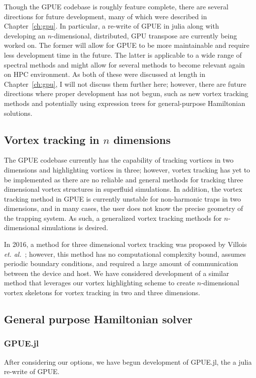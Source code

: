 Though the GPUE codebase is roughly feature complete, there are several directions for future development, many of which were described in Chapter~\ref{ch:gpu}.
In particular, a re-write of GPUE in julia along with developing an $n$-dimensional, distributed, GPU transpose are currently being worked on.
The former will allow for GPUE to be more maintainable and require less development time in the future.
The latter is applicable to a wide range of spectral methods and might allow for several methods to become relevant again on HPC environment.
As both of these were discussed at length in Chapter~\ref{ch:gpu}, I will not discuss them further here; however,
there are future directions where proper development has not begun, such as new vortex tracking methods and potentially using expression trees for general-purpose Hamiltonian solutions.

\subsection{Vortex tracking in $n$ dimensions}

The GPUE codebase currently has the capability of tracking vortices in two dimensions and highlighting vortices in three; however, vortex tracking has yet to be implemented as there are no reliable and general methods for tracking three dimensional vortex structures in superfluid simulations.
In addition, the vortex tracking method in GPUE is currently unstable for non-harmonic traps in two dimensions, and in many cases, the user does not know the precise geometry of the trapping system.
As such, a generalized vortex tracking methods for $n$-dimensional simulations is desired.

In 2016, a method for three dimensional vortex tracking was proposed by Villois \textit{et. al.}~\cite{villois2016}; however, this method has no computational complexity bound, assumes periodic boundary conditions, and required a large amount of communication between the device and host.
We have considered development of a similar method that leverages our vortex highlighting scheme to create $n$-dimensional vortex skeletons for vortex tracking in two and three dimensions.

\subsection{General purpose Hamiltonian solver}

\subsubsection{GPUE.jl}
After considering our options, we have begun development of GPUE.jl, the a julia re-write of GPUE.

